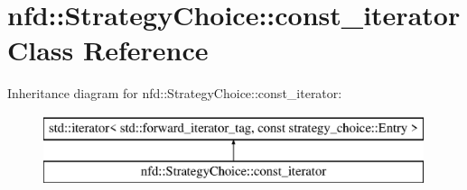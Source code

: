 \hypertarget{classnfd_1_1StrategyChoice_1_1const__iterator}{}\section{nfd\+:\+:Strategy\+Choice\+:\+:const\+\_\+iterator Class Reference}
\label{classnfd_1_1StrategyChoice_1_1const__iterator}
Inheritance diagram for nfd\+:\+:Strategy\+Choice\+:\+:const\+\_\+iterator\+:\begin{figure}[H]
\begin{center}
\leavevmode
\includegraphics[height=2.000000cm]{classnfd_1_1StrategyChoice_1_1const__iterator}
\end{center}
\end{figure}
